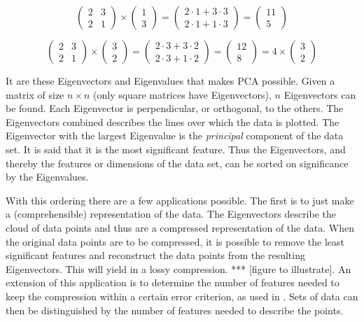 \begin{equation} \label{eq:no-eigenvector}
	\begin{pmatrix} 2 & 3 \\ 2 & 1 \end{pmatrix}
\times
	\begin{pmatrix} 1 \\ 3 \end{pmatrix}
=
	\begin{pmatrix} 2 \cdot 1 + 3 \cdot 3 \\ 2 \cdot 1 + 1 \cdot 3 
	\end{pmatrix}
=
	\begin{pmatrix} 11 \\ 5 \end{pmatrix}
\end{equation}

\begin{equation} \label{eq:eigenvector}
	\begin{pmatrix} 2 & 3 \\ 2 & 1 \end{pmatrix}
\times
	\begin{pmatrix} 3 \\ 2 \end{pmatrix}
=
	\begin{pmatrix} 2 \cdot 3 + 3 \cdot 2 \\ 2 \cdot 3 + 1 \cdot 2  
	\end{pmatrix}
=
	\begin{pmatrix} 12 \\ 8 \end{pmatrix}
=
	4 \times \begin{pmatrix} 3 \\ 2 \end{pmatrix}
\end{equation}

It are these Eigenvectors and Eigenvalues that makes PCA possible. Given a 
matrix of size $n \times n$ (only square matrices have Eigenvectors), $n$ 
Eigenvectors can be found. Each Eigenvector is perpendicular, or orthogonal, 
to the others. The Eigenvectors combined describes the lines over which the 
data is plotted. The Eigenvector with the largest Eigenvalue is the 
\emph{principal} component of the data set. It is said that it is the most 
significant feature. Thus the Eigenvectors, and thereby the features or 
dimensions of the data set, can be sorted on significance by the Eigenvalues.

With this ordering there are a few applications possible. The first is to just 
make a (comprehensible) representation of the data. The Eigenvectors describe 
the cloud of data points and thus are a compressed representation of the data. 
When the original data points are to be compressed, it is possible to remove 
the least significant features and reconstruct the data points from the 
resulting Eigenvectors. This will yield in a lossy compression. *** [figure to 
illustrate]. An extension of this application is to determine the number of 
features needed to keep the compression within a certain error criterion, as 
used in \cite{barbivc2004segmenting}. Sets of data can then be distinguished 
by the number of features needed to describe the points.

